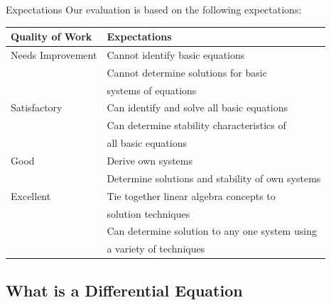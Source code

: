 \begin{frame}{Expectations}\small
  Our evaluation is based on the following expectations: \\
  \hspace*{-2em}
\begin{tabular}{|l@{\hspace{2em}}l|} \hline
  Quality of Work    & Expectations \\ \hline
  Needs Improvement  & Cannot identify basic equations \\
                     & Cannot determine solutions for basic \\
                     & systems of equations \\ \hline
  Satisfactory       & Can identify and solve all basic equations \\ 
                     & Can determine stability characteristics of \\
                     & all basic equations \\ \hline
  Good               & Derive own systems \\
                     & Determine solutions and stability of own systems \\ \hline
  Excellent          & Tie together linear algebra concepts to \\
                     & solution techniques \\
                     & Can determine solution to any one system using \\
                     & a variety of techniques \\ \hline
\end{tabular}
\end{frame}

\subsection{What is a Differential Equation}

